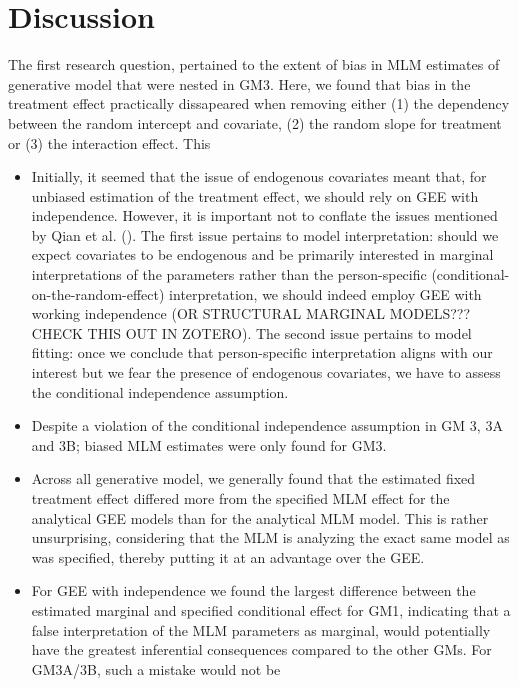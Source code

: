 \documentclass[
  12pt,
  a4paper,
]{article}
\begin{document}
\section{Discussion}\label{discussion}

The first research question, pertained to the extent of bias in MLM
estimates of generative model that were nested in GM3. Here, we found
that bias in the treatment effect practically dissapeared when removing
either (1) the dependency between the random intercept and covariate,
(2) the random slope for treatment or (3) the interaction effect. This

\begin{itemize}
\item
  Initially, it seemed that the issue of endogenous covariates meant
  that, for unbiased estimation of the treatment effect, we should rely
  on GEE with independence. However, it is important not to conflate the
  issues mentioned by Qian et al. (). The
  first issue pertains to model interpretation: should we expect
  covariates to be endogenous and be primarily interested in marginal
  interpretations of the parameters rather than the person-specific
  (conditional-on-the-random-effect) interpretation, we should indeed
  employ GEE with working independence (OR STRUCTURAL MARGINAL MODELS???
  CHECK THIS OUT IN ZOTERO). The second issue pertains to model fitting:
  once we conclude that person-specific interpretation aligns with our
  interest but we fear the presence of endogenous covariates, we have to
  assess the conditional independence assumption.
\item
  Despite a violation of the conditional independence assumption in GM
  3, 3A and 3B; biased MLM estimates were only found for GM3.
\item
  Across all generative model, we generally found that the estimated
  fixed treatment effect differed more from the specified MLM effect for
  the analytical GEE models than for the analytical MLM model. This is
  rather unsurprising, considering that the MLM is analyzing the exact
  same model as was specified, thereby putting it at an advantage over
  the GEE.
\item
  For GEE with independence we found the largest difference between the
  estimated marginal and specified conditional effect for GM1,
  indicating that a false interpretation of the MLM parameters as
  marginal, would potentially have the greatest inferential consequences
  compared to the other GMs. For GM3A/3B, such a mistake would not be

\end{itemize}
\end{document}
